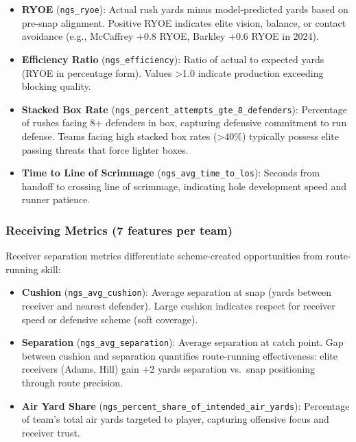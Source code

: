 \begin{itemize}
  \item \textbf{RYOE} (\texttt{ngs\_ryoe}): Actual rush yards minus model-predicted yards based on pre-snap alignment. Positive RYOE indicates elite vision, balance, or contact avoidance (e.g., McCaffrey +0.8 RYOE, Barkley +0.6 RYOE in 2024).

  \item \textbf{Efficiency Ratio} (\texttt{ngs\_efficiency}): Ratio of actual to expected yards (RYOE in percentage form). Values >1.0 indicate production exceeding blocking quality.

  \item \textbf{Stacked Box Rate} (\texttt{ngs\_percent\_attempts\_gte\_8\_defenders}): Percentage of rushes facing 8+ defenders in box, capturing defensive commitment to run defense. Teams facing high stacked box rates (>40\%) typically possess elite passing threats that force lighter boxes.

  \item \textbf{Time to Line of Scrimmage} (\texttt{ngs\_avg\_time\_to\_los}): Seconds from handoff to crossing line of scrimmage, indicating hole development speed and runner patience.
\end{itemize}

\subsubsection{Receiving Metrics (7 features per team)}

Receiver separation metrics differentiate scheme-created opportunities from route-running skill:

\begin{itemize}
  \item \textbf{Cushion} (\texttt{ngs\_avg\_cushion}): Average separation at snap (yards between receiver and nearest defender). Large cushion indicates respect for receiver speed or defensive scheme (soft coverage).

  \item \textbf{Separation} (\texttt{ngs\_avg\_separation}): Average separation at catch point. Gap between cushion and separation quantifies route-running effectiveness: elite receivers (Adams, Hill) gain +2 yards separation vs.\ snap positioning through route precision.

  \item \textbf{Air Yard Share} (\texttt{ngs\_percent\_share\_of\_intended\_air\_yards}): Percentage of team's total air yards targeted to player, capturing offensive focus and receiver trust.
\end{itemize}


